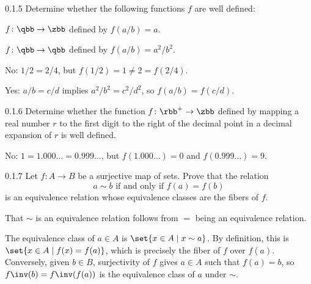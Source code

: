 \begin{exercise}{0.1.5}
    Determine whether the following functions $f$ are well defined:
    \begin{subexercises}
        \item $f \colon \qbb \to \zbb$ defined by $f(a/b) = a$.
        \item $f \colon \qbb \to \qbb$ defined by $f(a/b) = a^2/b^2$.
    \end{subexercises}
\end{exercise}

\begin{solenum}
    \item No: $1/2 = 2/4$, but $f(1/2) = 1 \neq 2 = f(2/4)$.
    \item Yes: $a/b = c/d$ implies $a^2/b^2 = c^2/d^2$, so $f(a/b) = f(c/d)$.
\end{solenum}

\begin{exercise}{0.1.6}
    Determine whether the function $f \colon \rbb^+ \to \zbb$ defined by mapping a real number $r$ to the first digit to the right of the decimal point in a decimal expansion of $r$ is well defined.
\end{exercise}

\begin{sol}
    No: $1=1.000\ldots = 0.999\ldots$, but $f(1.000\ldots) = 0$ and $f(0.999\ldots) = 9$.
\end{sol}

\begin{exercise}{0.1.7}
    Let $f \colon A \to B$ be a surjective map of sets.
	Prove that the relation
    \[
    	a \sim b \text{ if and only if } f(a) = f(b)
    \]
    is an equivalence relation whose equivalence classes are the fibers of $f$.
\end{exercise}

\begin{sol}
    That $\sim$ is an equivalence relation follows from $=$ being an equivalence relation.

    The equivalence class of $a \in A$ is $\set{x \in A \mid x \sim a}$.
	By definition, this is $\set{x \in A \mid f(x) = f(a)}$, which is precisely the fiber of $f$ over $f(a)$.
    Conversely, given $b \in B$, surjectivity of $f$ gives $a \in A$ such that $f(a) = b$, so $f\inv(b) = f\inv(f(a))$ is the equivalence class of $a$ under $\sim$.
\end{sol}